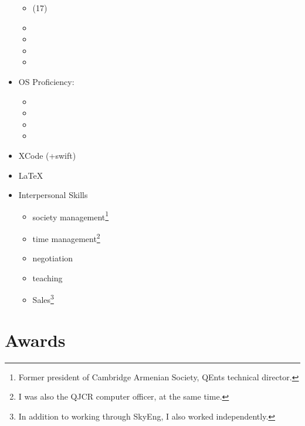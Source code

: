 \documentclass{CurriculumVitae}[10pt, draft, condensed]
\begin{document}
\begin{multicols}{4}
\begin{itemize}[topsep=0pt]
\begin{itemize}[topsep=0pt, partopsep=0pt]
    \item {} (17)
    \item {}
    \item {}
    \item {}
    \item {}
    \end{itemize}
  \item {\footnotesize OS Proficiency:}
    \begin{itemize}[topsep=0pt, partopsep=0pt]
      \setlength{\itemsep}{-0.3em}
    \item {}
    \item {}
    \item {}
    \item {}
    \end{itemize}
  \item {\footnotesize XCode (+swift)}
  \item {\footnotesize \LaTeX{}}
  \item {\footnotesize Interpersonal Skills}
    \begin{itemize}[topsep=0pt, partopsep=0pt]
      \setlength{\itemsep}{-0.3em}
    \item society management\footnote{Former president of Cambridge
        Armenian Society, QEnts technical director.}
    \item time management\footnote{I was also the QJCR computer
        officer, at the same time. }
    \item negotiation
    \item teaching
    \item Sales\footnote{In addition to working through SkyEng, I also
        worked independently. }
    \end{itemize}
  \end{itemize}
  
\end{multicols}

\section*{Awards}







\end{document}
